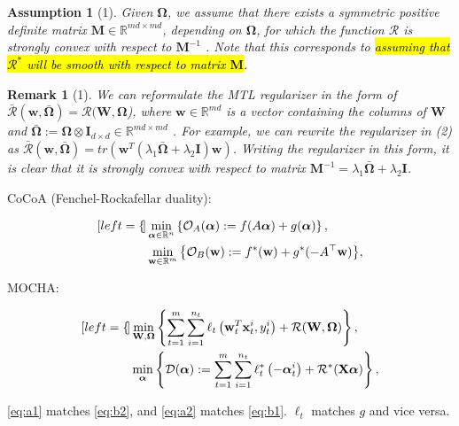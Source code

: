 \documentclass[UTF8,aspectratio=169,presentation]{ctexbeamer}
\makeatletter
\let\HL\hl
\renewcommand\hl{%
  \let\set@color\beamerorig@set@color
  \let\reset@color\beamerorig@reset@color
  \HL}
\newtheorem{assumption}{Assumption}
\newtheorem{remark}{Remark}
\makeatother
\begin{document}
\begin{frame}[t]
\begin{assumption}[1]
  Given $\boldsymbol\Omega$, we assume that there exists a symmetric positive definite matrix $\mathbf M \in \mathbb R^{md×md}$, depending on $\boldsymbol\Omega$, for which the function $\mathcal R$ is strongly convex with respect to $\mathbf M^{−1}$ . Note
  that this corresponds to \hl{assuming that $\mathcal R^{*}$ will be smooth with respect to matrix $\mathbf M$}.
  
\end{assumption}

\begin{remark}[1]
  We can reformulate the MTL regularizer in the form of $\bar{\mathcal R}(\mathbf w, \bar{\boldsymbol\Omega}) = \mathcal R( \mathbf W, \boldsymbol\Omega$), where
  $\mathbf w \in \mathbb R^{md}$ is a vector containing the columns of $\mathbf W$ and $ \bar{\boldsymbol \Omega}  := \boldsymbol\Omega \otimes \mathbf I_{d×d} \in \mathbb R^{md\times md}$
  . For example, we can rewrite the regularizer in (2) as $\bar{\mathcal R}( \mathbf w,\bar{\boldsymbol \Omega} ) = tr(\mathbf w^T (\lambda_1 \bar{\boldsymbol\Omega}+ \lambda_2 \mathbf I) \mathbf w)$. Writing the regularizer
  in this form, it is clear that it is strongly convex with respect to matrix $\mathbf M^{−1} = \lambda_1 \bar{\boldsymbol\Omega}+ \lambda_2 \mathbf I$.
\end{remark}
\end{frame}


\begin{frame}[c]


CoCoA (Fenchel-Rockafellar
duality):

\begin{subequations}
  \begin{align}[left=\empheqlbrace]
      & \min _{\boldsymbol{\alpha} \in \mathbb{R}^{n}}  \left\{ {\mathcal{O}_{A}(\boldsymbol{\alpha}) :=f(A \boldsymbol{\alpha})+g(\boldsymbol{\alpha})} \right\} , \label{eq:a1} \\
      & \min _{\mathbf{w} \in \mathbb{R}^{m}} {\left\{\mathcal{O}_{B}(\mathbf{w}) :=f^{*}(\mathbf{w})+g^{*}(-A^{\top} \mathbf{w})\right\}},  \label{eq:a2}
    \end{align}
\end{subequations}

MOCHA:

\begin{subequations}
  \begin{align}[left=\empheqlbrace]
      & \eqone, \label{eq:b1} \\
      & \eqtwo, \label{eq:b2} 
    \end{align}
\end{subequations}

\ref{eq:a1} matches \ref{eq:b2}, and \ref{eq:a2} matches \ref{eq:b1}. $\ell_t$ matches $g$ and vice versa.

\end{frame}
\end{document}
